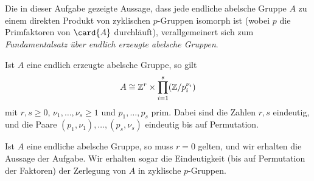 \section{}





\subsection{}

Die in dieser Aufgabe gezeigte Aussage, dass jede endliche abelsche Gruppe $A$ zu einem direkten Produkt von zyklischen $p$-Gruppen isomorph ist (wobei $p$ die Primfaktoren von $\card{A}$ durchläuft), verallgemeinert sich zum \emph{Fundamentalsatz über endlich erzeugte abelsche Gruppen}.

\begin{theorem}
  \label{theorem: fundamental theorem for finitely generated abelian groups}
  Ist $A$ eine endlich erzeugte abelsche Gruppe, so gilt
  \[
          A
    \cong \mathbb{Z}^r \times \prod_{i=1}^s (\mathbb{Z}/p_i^{\nu_i})
  \]
  mit $r, s \geq 0$, $\nu_1, \dotsc, \nu_s \geq 1$ und $p_1, \dotsc, p_s$ prim.
  Dabei sind die Zahlen $r, s$ eindeutig, und die Paare $(p_1, \nu_1), \dotsc, (p_s, \nu_s)$ eindeutig bis auf Permutation.
\end{theorem}

Ist $A$ eine endliche abelsche Gruppe, so muss $r = 0$ gelten, und wir erhalten die Aussage der Aufgabe.
Wir erhalten sogar die Eindeutigkeit (bis auf Permutation der Faktoren) der Zerlegung von $A$ in zyklische $p$-Gruppen.

